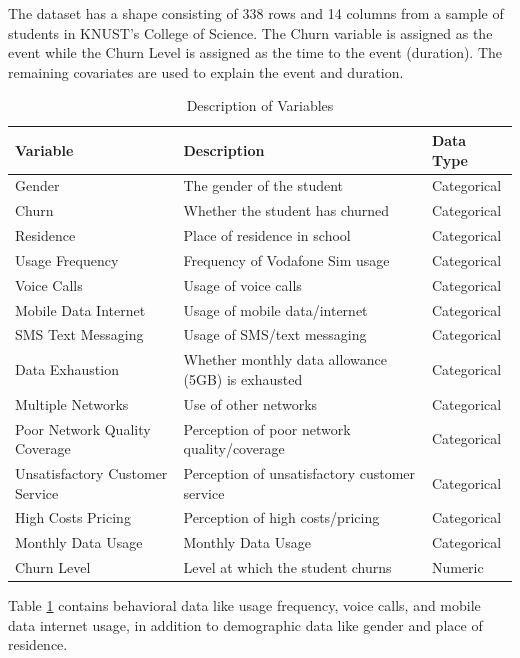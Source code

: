 \documentclass[doublespacing,12pt]{report}
\begin{document}
The dataset has a shape consisting of 338 rows and 14 columns from a sample of students in KNUST's College of Science. The Churn variable is assigned as the event while the Churn Level is assigned as the time to the event (duration). The remaining covariates are used to explain the event and duration.
\begin{table}[H]
    \centering
    \begin{tabularx}{\textwidth}{XXl}
        \toprule
        \textbf{Variable} & \textbf{Description} & \textbf{Data Type} \\
        \midrule
        Gender & The gender of the student & Categorical \\
        Churn & Whether the student has churned & Categorical \\
        Residence & Place of residence in school & Categorical \\
        Usage Frequency & Frequency of Vodafone Sim usage & Categorical \\
        Voice Calls & Usage of voice calls & Categorical \\
        Mobile Data Internet & Usage of mobile data/internet & Categorical \\
        SMS Text Messaging & Usage of SMS/text messaging & Categorical \\
        Data Exhaustion & Whether monthly data allowance (5GB) is exhausted & Categorical \\
        Multiple Networks & Use of other networks &Categorical \\
        Poor Network Quality Coverage & Perception of poor network quality/coverage & Categorical \\
        Unsatisfactory Customer Service & Perception of unsatisfactory customer service & Categorical \\
        High Costs Pricing & Perception of high costs/pricing & Categorical \\
        Monthly Data Usage & Monthly Data Usage & Categorical \\
        Churn Level & Level at which the student churns & Numeric \\
        \bottomrule
    \end{tabularx}
    \caption{Description of Variables}
    \label{tab: 4.1}
\end{table}
\noindent Table \ref{tab: 4.1} contains behavioral data like usage frequency, voice calls, and mobile data internet usage, in addition to demographic data like gender and place of residence.
\end{document}
